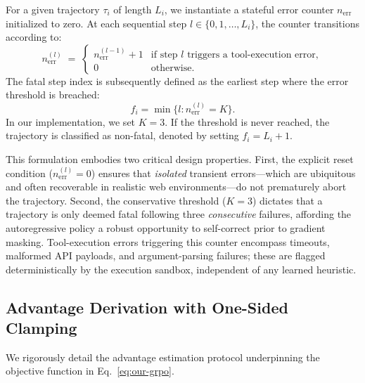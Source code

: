 For a given trajectory $\tau_i$ of length $L_i$, we instantiate a stateful error counter $n_{\text{err}}$ initialized to zero. At each sequential step $l \in \{0, 1, \dots, L_i\}$, the counter transitions according to:
\begin{equation}
  n_{\text{err}}^{(l)} \;=\;
  \begin{cases}
    n_{\text{err}}^{(l-1)} + 1 & \text{if step } l \text{ triggers a tool-execution error},\\
    0 & \text{otherwise}.
  \end{cases}
\end{equation}
The fatal step index is subsequently defined as the earliest step where the error threshold is breached:
\begin{equation}
    f_i = \min\{l : n_{\text{err}}^{(l)} = K\}.
\end{equation}
In our implementation, we set $K=3$. If the threshold is never reached, the trajectory is classified as non-fatal, denoted by setting $f_i = L_i+1$. 

This formulation embodies two critical design properties. First, the explicit reset condition ($n_{\text{err}}^{(l)} = 0$) ensures that \emph{isolated} transient errors---which are ubiquitous and often recoverable in realistic web environments---do not prematurely abort the trajectory. Second, the conservative threshold ($K=3$) dictates that a trajectory is only deemed fatal following three \emph{consecutive} failures, affording the autoregressive policy a robust opportunity to self-correct prior to gradient masking. Tool-execution errors triggering this counter encompass timeouts, malformed API payloads, and argument-parsing failures; these are flagged deterministically by the execution sandbox, independent of any learned heuristic.

\subsection{Advantage Derivation with One-Sided Clamping}
\label{apdx:advantage-detail}

We rigorously detail the advantage estimation protocol underpinning the objective function in Eq.~\ref{eq:our-grpo}.

